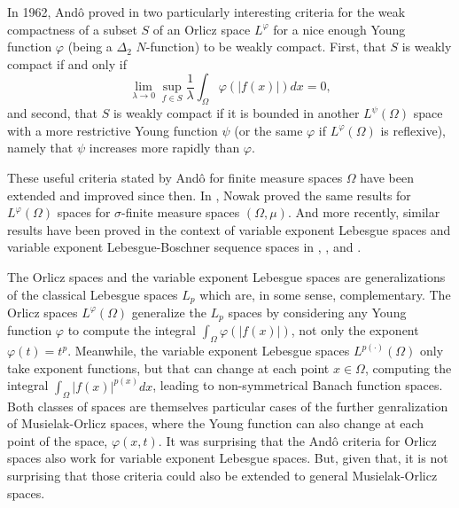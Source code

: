 \documentclass[11pt,a4paper]{amsart}
\newcommand{\lphi}{{L^{\varphi}(\Omega)}}
\newcommand{\lpsi}{{L^{\psi}(\Omega)}}
\begin{document}
In 1962, Andô proved in \cite{Ando} two particularly interesting criteria for the weak compactness of a subset $S$ of an Orlicz space $L^{\varphi}$ for a nice enough Young function $\varphi$ (being a $\Delta_2$ $N$-function) to be weakly compact. First, that $S$ is weakly compact if and only if
$$
\lim_{\lambda\rightarrow 0}\sup_{f\in S} \frac{1}{\lambda}\int_{\Omega} \varphi(\vert f(x)\vert) dx=0,
$$
and second, that $S$ is weakly compact if it is bounded in another $\lpsi$ space with a more restrictive Young function $\psi$ (or the same $\varphi$ if $\lphi$ is reflexive), namely that $\psi$ increases more rapidly than $\varphi$.

These useful criteria stated by And\^o for finite measure spaces $\Omega$ have been extended and improved since then. In \cite{Nowak}, Nowak proved the same results for $\lphi$ spaces for $\sigma$-finite measure spaces $(\Omega,\mu)$. And more recently, similar results have been proved in the context of variable exponent Lebesgue spaces and variable exponent Lebesgue-Boschner sequence spaces in \cite{PCM}, \cite{PCM2}, \cite{PCM3} and \cite{ShiShiWang}.

The Orlicz spaces and the variable exponent Lebesgue spaces are generalizations of the classical Lebesgue spaces $L_p$ which are, in some sense, complementary. The Orlicz spaces $\lphi$ generalize the $L_p$ spaces by considering any Young function $\varphi$ to compute the integral $\int_\Omega \varphi(\vert f(x)\vert)$, not only the exponent $\varphi(t)=t^p$. Meanwhile, the variable exponent Lebesgue spaces $L^{p(\cdot)}(\Omega)$ only take exponent functions, but that can change at each point $x\in\Omega$, computing the integral $\int_\Omega \vert f(x)\vert^{p(x)} dx$, leading to non-symmetrical Banach function spaces. Both classes of spaces are themselves particular cases of the further genralization of Musielak-Orlicz spaces, where the Young function can also change at each point of the space, $\varphi(x,t)$. It was surprising that the Andô criteria for Orlicz spaces also work for variable exponent Lebesgue spaces. But, given that, it is not surprising that those criteria could also be extended to general Musielak-Orlicz spaces.
\end{document}

